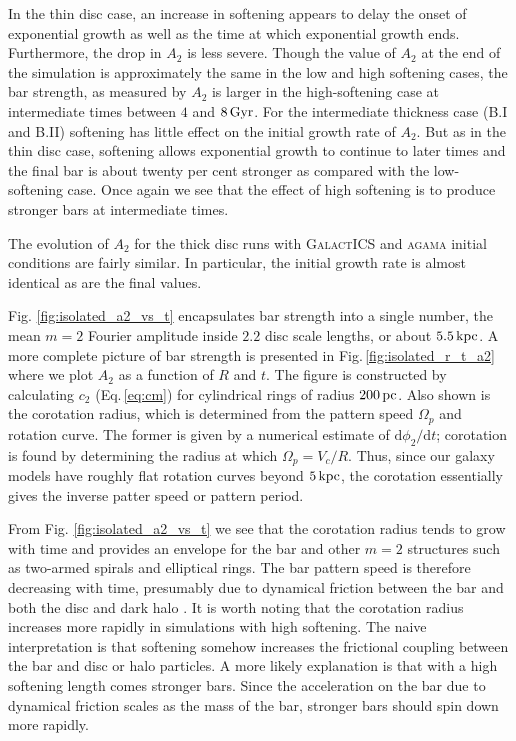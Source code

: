 In the thin disc case, an increase in softening appears to delay the
onset of exponential growth as well as the time at which exponential
growth ends.  Furthermore, the drop in $A_2$ is less severe.  Though
the value of $A_2$ at the end of the simulation is approximately the
same in the low and high softening cases, the bar strength, as
measured by $A_2$ is larger in the high-softening case at intermediate
times between $4$ and $8\,{\rm Gyr}$.  For the intermediate thickness
case (B.I and B.II) softening has little effect on the initial
growth rate of $A_2$.  But as in the thin disc case, softening
allows exponential growth to continue to later times and the final bar
is about twenty per cent stronger as compared with the low-softening
case.  Once again we see that the effect of high softening is to
produce stronger bars at intermediate times.

The evolution of $A_2$ for the thick disc runs with \textsc{GalactICS}
and \textsc{agama} initial conditions are fairly similar.  In particular,
the initial growth rate is almost identical as are the final values.

Fig. \ref{fig:isolated_a2_vs_t} encapsulates bar strength into a
single number, the mean $m=2$ Fourier amplitude inside $2.2$ disc
scale lengths, or about $5.5\,{\rm kpc}$.  A more complete picture of
bar strength is presented in Fig.\,\ref{fig:isolated_r_t_a2} where we
plot $A_2$ as a function of $R$ and $t$. The figure is constructed by
calculating $c_2$ (Eq.\,\ref{eq:cm}) for cylindrical rings of radius
$200\,{\rm pc}$.  Also shown is the corotation radius, which is
determined from the pattern speed $\Omega_p$ and rotation curve. The
former is given by a numerical estimate of ${\text{d}
  \phi_2}/{\text{d} t}$; corotation is found by determining the radius
at which $\Omega_p = V_c/R$.  Thus, since our galaxy models have
roughly flat rotation curves beyond $5\,{\rm kpc}$, the corotation
essentially gives the inverse patter speed or pattern period.

From Fig. \ref{fig:isolated_a2_vs_t} we see that the corotation radius
tends to grow with time and provides an envelope for the bar and other
$m=2$ structures such as two-armed spirals and elliptical rings.  The
bar pattern speed is therefore decreasing with time, presumably due to
dynamical friction between the bar and both the disc and dark halo
\citep{debattista1998, debattista2000}.  It is worth noting that the
corotation radius increases more rapidly in simulations with high
softening.  The naive interpretation is that softening somehow
increases the frictional coupling between the bar and disc or halo
particles.  A more likely explanation is that with a high softening
length comes stronger bars.  Since the acceleration on the bar due to
dynamical friction scales as the mass of the bar, stronger bars should
spin down more rapidly.

